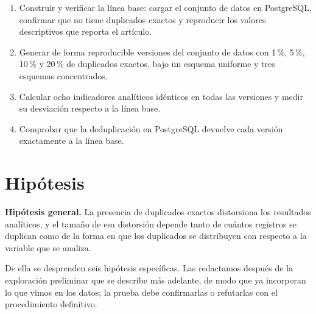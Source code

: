 \documentclass[11pt,openany,oneside,letterpaper]{book}
\begin{document}
\begin{enumerate}
 \item Construir y verificar la línea base: cargar el conjunto de datos en PostgreSQL, confirmar que no tiene duplicados exactos y reproducir los valores descriptivos que reporta el artículo.
 \item Generar de forma reproducible versiones del conjunto de datos con 1\,\%, 5\,\%, 10\,\% y 20\,\% de duplicados exactos, bajo un esquema uniforme y tres esquemas concentrados.
 \item Calcular ocho indicadores analíticos idénticos en todas las versiones y medir su desviación respecto a la línea base.
 \item Comprobar que la deduplicación en PostgreSQL devuelve cada versión exactamente a la línea base.
\end{enumerate}

\section{Hipótesis}

\textbf{Hipótesis general.} La presencia de duplicados exactos distorsiona los resultados analíticos, y el tamaño de esa distorsión depende tanto de cuántos registros se duplican como de la forma en que los duplicados se distribuyen con respecto a la variable que se analiza.

De ella se desprenden seis hipótesis específicas. Las redactamos después de la exploración preliminar que se describe más adelante, de modo que ya incorporan lo que vimos en los datos; la prueba debe confirmarlas o refutarlas con el procedimiento definitivo.
\end{document}
